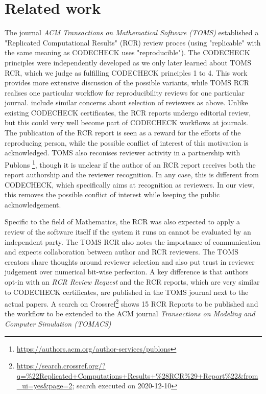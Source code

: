 \documentclass[12pt]{article}
\begin{document}
\section*{Related work}\label{related-work}

The journal \emph{ACM Transactions on Mathematical Software (TOMS)} 
established a "Replicated Computational Results" (RCR) review proces
\cite{heroux_editorial_2015} (using "replicable" with the same meaning 
as CODECHECK uses "reproducible").
The CODECHECK principles were independently developed as we only later 
learned about TOMS RCR, which we judge as fulfilling CODECHECK principles
1 to 4.
This work provides more extensive discussion of the possible variants, 
while TOMS RCR realises one particular workflow for reproducibility 
reviews for one particular journal. \cite{heroux_editorial_2015}
include similar concerns about
selection of reviewers as above. Unlike existing CODECHECK certificates, 
the RCR reports undergo editorial review, but this could very well become
part of CODECHECK workflows at journals.
The publication of the RCR report is seen as a reward for the efforts of
the reproducing person, while the possible conflict of interest of this 
motivation is acknowledged. TOMS also reconises reviewer activity in a 
partnership with Publons
\footnote{\url{https://authors.acm.org/author-services/publons}},
though it is unclear if the author of an RCR report receives both the report
authorship and the reviewer recognition. In any case, this is different
from CODECHECK, which specifically aims at recognition as reviewers.
In our view, this removes the possible conflict of interest while keeping
the public acknowledgement.

Specific to the field of Mathematics, the RCR was also  expected to apply a
review of the software itself if the system it runs on cannot be evaluated by
an independent party.
The TOMS RCR also notes the importance of communication and expects
collaboration between author and RCR reviewers.
The TOMS creators share thoughts around reviewer selection and also put trust
in reviewer judgement over numerical bit-wise perfection.
A key difference is that authors opt-in with an \emph{RCR Review Request} and
the RCR reports, which are very similar to CODECHECK certificates, are
published in the TOMS journal next to the actual papers.
A search on Crossref\footnote{\url{https://search.crossref.org/?q=\%22Replicated+Computations+Results+\%28RCR\%29+Report\%22&from_ui=yes&page=2}; search executed
on 2020-12-10} shows 15 RCR Reports to be published and the workflow to be 
extended to the ACM journal \emph{Transactions on Modeling and Computer 
  Simulation (TOMACS)}
\end{document}
